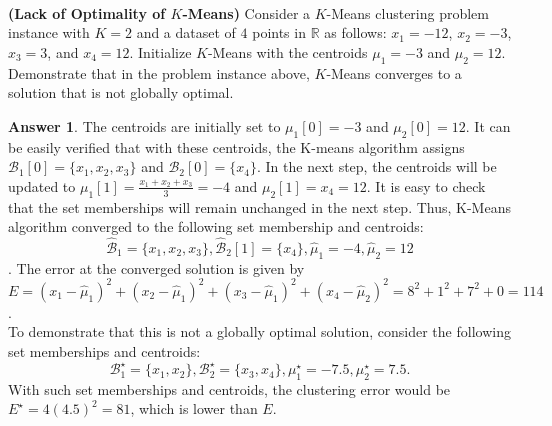 \documentclass{article}
\title{\vspace{-2.5cm}\textbf{\coursefullname}\\\hatypeandnun\\\haname}
\date{}
\theoremstyle{definition}
\newtheorem*{answer}{Answer}
\begin{document}
\maketitle
\vspace*{-2cm}
\begin{question}[start=1]
	\item \textbf{(Lack of Optimality of $K$-Means)} Consider a $K$-Means clustering problem instance with $K = 2$ and a dataset of $4$ points in $\mathbb{R}$ as follows: $x_1 = -12$, $x_2 = -3$, $x_3 = 3$, and $x_4 = 12$. Initialize $K$-Means with the centroids $\mu_1 = -3$ and $\mu_2 = 12$. Demonstrate that in the problem instance above, $K$-Means converges to a solution that is not globally optimal.
	\begin{answer}
		The centroids are initially set to $\mu_1[0] = -3$ and $\mu_2[0] = 12$. It can be easily verified that with these centroids, the K-means algorithm assigns $\mathcal{B}_1[0] = \{x_1, x_2, x_3\}$ and $\mathcal{B}_2[0] = \{x_4\}$. In the next step, the centroids will be updated to $\mu_1[1] = \frac{x_1 + x_2 + x_3}{3} = -4$ and $\mu_2[1] = x_4=12$. It is easy to check that the set memberships will remain unchanged in the next step. Thus, K-Means algorithm converged to the following set membership and centroids: $$\hat{\mathcal{B}}_1 = \{x_1, x_2, x_3\}, \hat{\mathcal{B}}_2[1] = \{x_4\}, \hat{\mu}_1 =-4, \hat{\mu}_2 = 12$$. The error at the converged solution is given by $E = (x_1 - \hat{\mu}_1)^2 + (x_2 - \hat{\mu}_1)^2 + (x_3 - \hat{\mu}_1)^2 + (x_4 - \hat{\mu}_2)^2 = 8^2 + 1^2 + 7^2 + 0 = 114$.\\
		
		To demonstrate that this is not a globally optimal solution, consider the following set memberships and centroids: $$\mathcal{B}^\star_1 = \{x_1, x_2\}, \mathcal{B}^\star_2 = \{x_3, x_4\}, \mu^\star_1 = -7.5, \mu^\star_2 = 7.5.$$ With such set memberships and centroids, the clustering error would be $E^\star = 4(4.5)^2 = 81$, which is lower than $E$.
	\end{answer}
	

\end{question}
\end{document}
